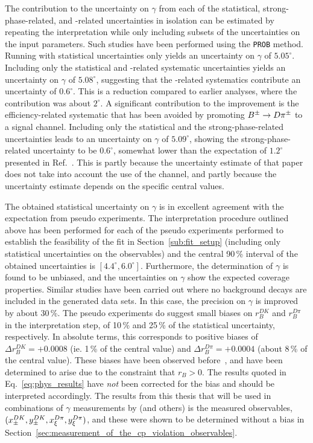 The contribution to the uncertainty on $\gamma$ from each of the statistical, strong-phase-related, and \lhcb-related uncertainties in isolation can be estimated by repeating the interpretation while only including subsets of the uncertainties on the input parameters. Such studies have been performed using the \texttt{PROB} method. Running with statistical uncertainties only yields an uncertainty on $\gamma$ of $5.05^\circ$. Including only the statistical and \lhcb-related systematic uncertainties yields an uncertainty on $\gamma$ of $5.08^\circ$, suggesting that the \lhcb-related systematics  contribute an uncertainty of $0.6^\circ$. This is a reduction compared to earlier analyses, where the contribution was about $2^\circ$. A significant contribution to the improvement is the efficiency-related systematic that has been avoided by promoting ${{{B}^\pm}\rightarrow{\ensuremath{D}}{\ensuremath{{\pi}^\pm}}}$ to a signal channel. Including only the statistical and the strong-phase-related uncertainties leads to an uncertainty on $\gamma$ of $5.09^\circ$, showing the strong-phase-related uncertainty to be $0.6^\circ$, somewhat lower than the expectation of $1.2^\circ$  presented in Ref.~\cite{BESCISI}. This is partly because the uncertainty estimate of that paper does not take into account the use of the \DtoKsKK channel, and partly because the uncertainty estimate depends on the specific central values.

The obtained statistical uncertainty on $\gamma$ is in excellent agreement with the expectation from pseudo experiments. The interpretation procedure outlined above has been performed for each of the pseudo experiments performed to establish the feasibility of the \CP fit in Section~\ref{sub:fit_setup} (including only statistical uncertainties on the observables) and the central 90\,\% interval of the obtained uncertainties is $[4.4^\circ, 6.0^\circ]$. Furthermore, the determination of $\gamma$ is found to be unbiased, and the uncertainties on $\gamma$ show the expected coverage properties. Similar studies have been carried out where no background decays are included in the generated data sets. In this case, the precision on $\gamma$ is improved by about 30\,\%. The pseudo experiments do suggest small biases on $r_B^{DK}$ and $r_B^{D\pi}$ in the interpretation step, of 10\,\% and 25\,\% of the statistical uncertainty, respectively. In absolute terms, this corresponds to positive biases of $\Delta r_B^{DK} = +0.0008$ (ie. 1\,\% of the central value) and $\Delta r_B^{D\pi} = +0.0004$ (about 8\,\% of the central value). These biases have been observed before~\cite{LHCb-PAPER-2016-032}, and have been determined to arise due to the constraint that $r_B>0$.  The results quoted in Eq.~\eqref{eq:phys_results} have \emph{not} been corrected for the bias and should be interpreted accordingly. The results from this thesis that will be used in combinations of $\gamma$ measurements by \lhcb (and others) is the measured observables, $(x_\pm^{{D}{K}}, y_\pm^{{D}{K}}, x_\xi^{{D}\pi}, y_\xi^{{D}\pi})$,  and these were shown to be determined without a bias in Section~\ref{sec:measurement_of_the_cp_violation_observables}.


